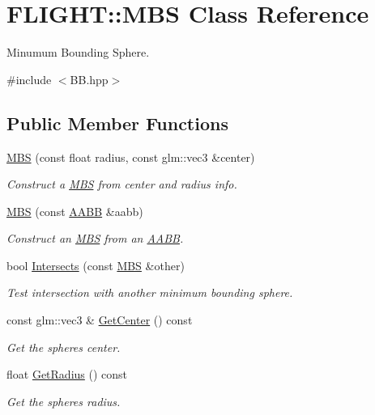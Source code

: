 \hypertarget{class_f_l_i_g_h_t_1_1_m_b_s}{}\section{F\+L\+I\+G\+HT\+:\+:M\+BS Class Reference}
\label{class_f_l_i_g_h_t_1_1_m_b_s}


Minumum Bounding Sphere.  




{\ttfamily \#include $<$B\+B.\+hpp$>$}

\subsection*{Public Member Functions}
\begin{DoxyCompactItemize}
\item 
\hyperlink{class_f_l_i_g_h_t_1_1_m_b_s_a367150004a0df49b18e89af212bc8576}{M\+BS} (const float radius, const glm\+::vec3 \&center)
\begin{DoxyCompactList}\small\item\em Construct a \hyperlink{class_f_l_i_g_h_t_1_1_m_b_s}{M\+BS} from center and radius info. \end{DoxyCompactList}\item 
\hyperlink{class_f_l_i_g_h_t_1_1_m_b_s_a2a0c036ce82df4f96002a61438eb1667}{M\+BS} (const \hyperlink{class_f_l_i_g_h_t_1_1_a_a_b_b}{A\+A\+BB} \&aabb)
\begin{DoxyCompactList}\small\item\em Construct an \hyperlink{class_f_l_i_g_h_t_1_1_m_b_s}{M\+BS} from an \hyperlink{class_f_l_i_g_h_t_1_1_a_a_b_b}{A\+A\+BB}. \end{DoxyCompactList}\item 
bool \hyperlink{class_f_l_i_g_h_t_1_1_m_b_s_abc1e05678a0c8e15937aeeda548ec066}{Intersects} (const \hyperlink{class_f_l_i_g_h_t_1_1_m_b_s}{M\+BS} \&other)
\begin{DoxyCompactList}\small\item\em Test intersection with another minimum bounding sphere. \end{DoxyCompactList}\item 
const glm\+::vec3 \& \hyperlink{class_f_l_i_g_h_t_1_1_m_b_s_a6c2f43b25ba2e362cbdcf1ce528ba68a}{Get\+Center} () const
\begin{DoxyCompactList}\small\item\em Get the sphere\textquotesingle{}s center. \end{DoxyCompactList}\item 
float \hyperlink{class_f_l_i_g_h_t_1_1_m_b_s_a23ede2b9770a4fe82e0cfc3ce2a9e28c}{Get\+Radius} () const
\begin{DoxyCompactList}\small\item\em Get the sphere\textquotesingle{}s radius. \end{DoxyCompactList}\end{DoxyCompactItemize}


